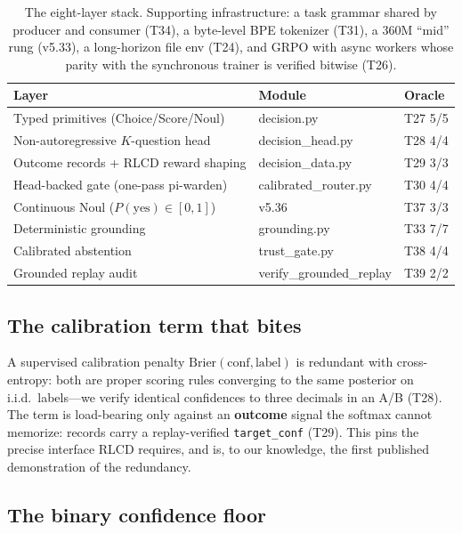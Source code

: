 \documentclass[11pt]{article}
\begin{document}
\begin{table}[h]
\centering\small
\begin{tabular}{@{}lll@{}}
\toprule
Layer & Module & Oracle \\
\midrule
Typed primitives (Choice/Score/Noul) & decision.py & T27 5/5 \\
Non-autoregressive $K$-question head & decision\_head.py & T28 4/4 \\
Outcome records + RLCD reward shaping & decision\_data.py & T29 3/3 \\
Head-backed gate (one-pass pi-warden) & calibrated\_router.py & T30 4/4 \\
Continuous Noul ($P(\text{yes}) \in [0,1]$) & v5.36 & T37 3/3 \\
Deterministic grounding & grounding.py & T33 7/7 \\
Calibrated abstention & trust\_gate.py & T38 4/4 \\
Grounded replay audit & verify\_grounded\_replay & T39 2/2 \\
\bottomrule
\end{tabular}
\caption{The eight-layer stack. Supporting infrastructure: a task
grammar shared by producer and consumer (T34), a byte-level BPE
tokenizer (T31), a 360M ``mid'' rung (v5.33), a long-horizon file env
(T24), and GRPO with async workers whose parity with the synchronous
trainer is verified bitwise (T26).}
\label{tab:stack}
\end{table}

\subsection{The calibration term that bites}

A supervised calibration penalty $\mathrm{Brier}(\mathrm{conf},
\text{label})$ is redundant with cross-entropy: both are proper scoring
rules converging to the same posterior on i.i.d.\ labels---we verify
identical confidences to three decimals in an A/B (T28). The term is
load-bearing only against an \textbf{outcome} signal the softmax cannot
memorize: records carry a replay-verified \texttt{target\_conf} (T29).
This pins the precise interface RLCD requires, and is, to our knowledge,
the first published demonstration of the redundancy.

\subsection{The binary confidence floor}
\end{document}
